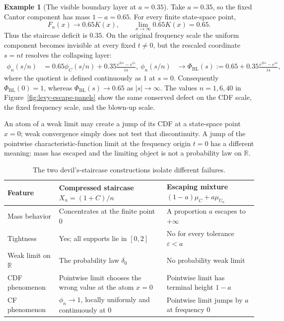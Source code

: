 \documentclass[10pt,a4paper]{article}
\numberwithin{equation}{section}
\theoremstyle{blueplain}
\theoremstyle{definition}
\newtheorem{example}[theorem]{Example}
\newcommand{\R}{\mathbb R}
\begin{document}
\begin{example}[The visible boundary layer at \(a=0.35\)]
Take \(a=0.35\), so the fixed Cantor component has mass \(1-a=0.65\).
For every finite state-space point,
\[
  F_n(x)\longrightarrow0.65K(x),
  \qquad
  \lim_{x\to\infty}0.65K(x)=0.65.
\]
Thus the staircase deficit is \(0.35\).  On the original frequency scale the
uniform component becomes invisible at every fixed \(t\ne0\), but the rescaled
coordinate \(s=nt\) resolves the collapsing layer:
\begin{align}
  \phi_n(s/n)
  &=0.65\phi_C(s/n)
    +0.35\frac{e^{2is}-e^{is}}{is},\
  \phi_n(s/n)&\longrightarrow
  \Phi_{\mathrm{BL}}(s)
  :=0.65+0.35\frac{e^{2is}-e^{is}}{is},
  \label{eq:boundary-layer-profile}
\end{align}
where the quotient is defined continuously as \(1\) at \(s=0\).
Consequently \(\Phi_{\mathrm{BL}}(0)=1\), whereas
\(\Phi_{\mathrm{BL}}(s)\to0.65\) as \(|s|\to\infty\).  The values
\(n=1,6,40\) in Figure~\ref{fig:levy-escape-panels} show the same conserved
defect on the CDF scale, the fixed frequency scale, and the blown-up scale.
\end{example}

\begin{keybox}
An atom of a weak limit may create a jump of its CDF at a state-space point
\(x=0\); weak convergence simply does not test that discontinuity.  A jump of
the pointwise characteristic-function limit at the frequency origin \(t=0\)
has a different meaning: mass has escaped and the limiting object is not a
probability law on \(\R\).
\end{keybox}

\begin{table}[ht]
\centering
\caption{The two devil's-staircase constructions isolate different failures.}
\small
\begin{tabularx}{\textwidth}{@{}p{3.3cm}XX@{}}
\toprule
Feature & Compressed staircase \(X_n=(1+C)/n\) & Escaping mixture \((1-a)\mu_C+a\mu_{U_n}\) \\
\midrule
Mass behavior
& Concentrates at the finite point \(0\)
& A proportion \(a\) escapes to \(+\infty\) \\
\addlinespace
Tightness
& Yes; all supports lie in \([0,2]\)
& No for every tolerance \(\varepsilon<a\) \\
\addlinespace
Weak limit on \(\R\)
& The probability law \(\delta_0\)
& No probability weak limit \\
\addlinespace
CDF phenomenon
& Pointwise limit chooses the wrong value at the atom \(x=0\)
& Pointwise limit has terminal height \(1-a\) \\
\addlinespace
CF phenomenon
& \(\phi_n\to1\), locally uniformly and continuously at \(0\)
& Pointwise limit jumps by \(a\) at frequency \(0\) \\
\bottomrule
\end{tabularx}
\end{table}
\end{document}
